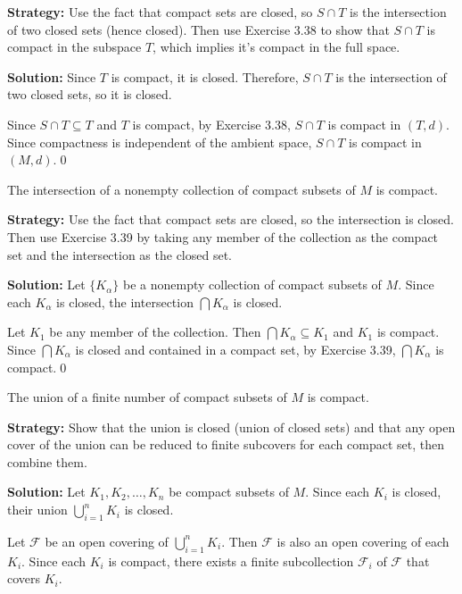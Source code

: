 \noindent\textbf{Strategy:} Use the fact that compact sets are closed, so $S \cap T$ is the intersection of two closed sets (hence closed). Then use Exercise 3.38 to show that $S \cap T$ is compact in the subspace $T$, which implies it's compact in the full space.

\bigskip\noindent\textbf{Solution:} Since $T$ is compact, it is closed. Therefore, $S \cap T$ is the intersection of two closed sets, so it is closed.

Since $S \cap T \subseteq T$ and $T$ is compact, by Exercise 3.38, $S \cap T$ is compact in $(T,d)$. Since compactness is independent of the ambient space, $S \cap T$ is compact in $(M,d)$.\qed


\begin{problembox}
The intersection of a nonempty collection of compact subsets of \( M \) is compact.
\end{problembox}

\noindent\textbf{Strategy:} Use the fact that compact sets are closed, so the intersection is closed. Then use Exercise 3.39 by taking any member of the collection as the compact set and the intersection as the closed set.

\bigskip\noindent\textbf{Solution:} Let $\{K_\alpha\}$ be a nonempty collection of compact subsets of $M$. Since each $K_\alpha$ is closed, the intersection $\bigcap K_\alpha$ is closed.

Let $K_1$ be any member of the collection. Then $\bigcap K_\alpha \subseteq K_1$ and $K_1$ is compact. Since $\bigcap K_\alpha$ is closed and contained in a compact set, by Exercise 3.39, $\bigcap K_\alpha$ is compact.\qed


\begin{problembox}
The union of a finite number of compact subsets of \( M \) is compact.
\end{problembox}

\noindent\textbf{Strategy:} Show that the union is closed (union of closed sets) and that any open cover of the union can be reduced to finite subcovers for each compact set, then combine them.

\bigskip\noindent\textbf{Solution:} Let $K_1, K_2, \ldots, K_n$ be compact subsets of $M$. Since each $K_i$ is closed, their union $\bigcup_{i=1}^n K_i$ is closed.

Let $\mathcal{F}$ be an open covering of $\bigcup_{i=1}^n K_i$. Then $\mathcal{F}$ is also an open covering of each $K_i$. Since each $K_i$ is compact, there exists a finite subcollection $\mathcal{F}_i$ of $\mathcal{F}$ that covers $K_i$.

